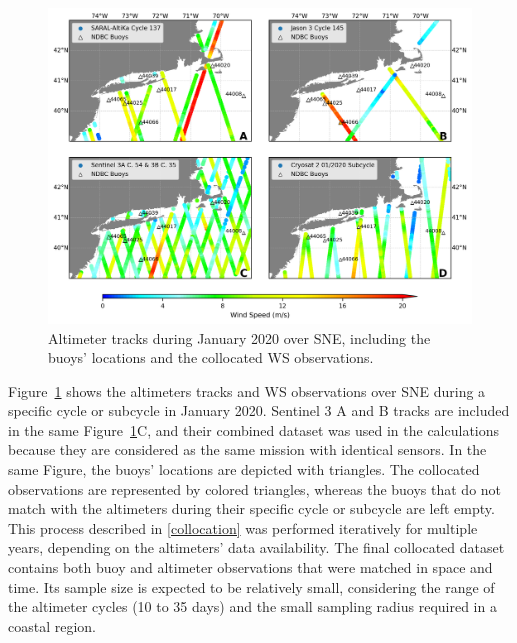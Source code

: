\begin{figure}[H]
\centering
\includegraphics[width=0.95\linewidth]{Figures/Chapter5/SNE_obs_altimeter_col2.png}
\caption{Altimeter tracks during January 2020 over SNE, including the buoys' locations and the collocated WS observations.}
\label{fig:altimeter_buoy_obs}
\end{figure}


Figure~\ref{fig:altimeter_buoy_obs} shows the altimeters tracks and WS observations over SNE during a specific cycle or subcycle in January 2020. Sentinel 3 A and B tracks are included in the same Figure~\ref{fig:altimeter_buoy_obs}C, and their combined dataset was used in the calculations because they are considered as the same mission with identical sensors. In the same Figure, the buoys' locations are depicted with triangles. The collocated observations are represented by colored triangles, whereas the buoys that do not match with the altimeters during their specific cycle or subcycle are left empty. This process described in \ref{collocation} was performed iteratively for multiple years, depending on the altimeters' data availability. The final collocated dataset contains both buoy and altimeter observations that were matched in space and time. Its sample size is expected to be relatively small, considering the range of the altimeter cycles (10 to 35 days) and the small sampling radius required in a coastal region.




